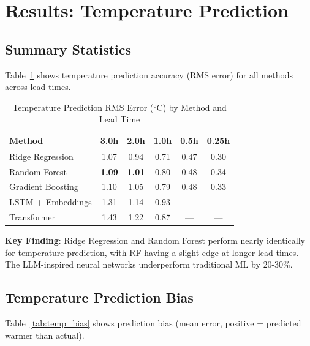 \documentclass[11pt,letterpaper]{article}
\begin{document}
\section{Results: Temperature Prediction}

\subsection{Summary Statistics}

Table~\ref{tab:temp_results} shows temperature prediction accuracy (RMS error) for all methods across lead times.

\begin{table}[H]
\centering
\caption{Temperature Prediction RMS Error (°C) by Method and Lead Time}
\label{tab:temp_results}
\begin{tabular}{l|ccccc}
\toprule
\textbf{Method} & \textbf{3.0h} & \textbf{2.0h} & \textbf{1.0h} & \textbf{0.5h} & \textbf{0.25h} \\
\midrule
Ridge Regression & 1.07 & 0.94 & 0.71 & 0.47 & 0.30 \\
\rowcolor{bestcolor} Random Forest & \textbf{1.09} & \textbf{1.01} & 0.80 & 0.48 & 0.34 \\
Gradient Boosting & 1.10 & 1.05 & 0.79 & 0.48 & 0.33 \\
\midrule
LSTM + Embeddings & 1.31 & 1.14 & 0.93 & --- & --- \\
Transformer & 1.43 & 1.22 & 0.87 & --- & --- \\
\bottomrule
\end{tabular}
\end{table}

\textbf{Key Finding}: Ridge Regression and Random Forest perform nearly identically for temperature prediction, with RF having a slight edge at longer lead times. The LLM-inspired neural networks underperform traditional ML by 20-30\%.

\subsection{Temperature Prediction Bias}

Table~\ref{tab:temp_bias} shows prediction bias (mean error, positive = predicted warmer than actual).
\end{document}
